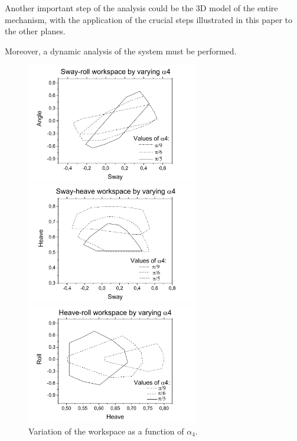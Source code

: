 \documentclass[10.5pt, twocolumn]{article}
\begin{document}
Another important step of the analysis could be the 3D model of the entire mechanism, with the application of the crucial steps illustrated in this paper to the other planes.

Moreover, a dynamic analysis of the system must be performed.

\begin{figure}
\centering
\begin{minipage}{0.49\textwidth}
	\includegraphics[width=7.5cm]{Images/ws_a4_xa}
\end{minipage}
\begin{minipage}{0.49\textwidth}
	\includegraphics[width=7.5cm]{Images/ws_a4_xy}
\end{minipage}
\begin{minipage}{0.49\textwidth}
	\includegraphics[width=7.5cm]{Images/ws_a4_ya}
\end{minipage}
    \caption{Variation of the workspace as a function of \( \alpha_4 \).}
    \label{fig:ws_1}
\end{figure}
\end{document}
